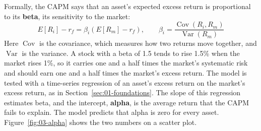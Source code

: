 Formally, the CAPM says that an asset's expected excess return is proportional to its \textbf{beta}, its sensitivity to the market:
\begin{equation}
  E[R_i] - r_f = \beta_i \left(E[R_m] - r_f\right), \qquad \beta_i = \frac{\operatorname{Cov}(R_i, R_m)}{\operatorname{Var}(R_m)}
  \label{eq:03-capm}
\end{equation}
Here $\operatorname{Cov}$ is the covariance, which measures how two returns move together, and $\operatorname{Var}$ is the variance. A stock with a beta of 1.5 tends to rise 1.5\% when the market rises 1\%, so it carries one and a half times the market's systematic risk and should earn one and a half times the market's excess return. The model is tested with a time-series regression of an asset's excess return on the market's excess return, as in Section~\ref{sec:01-foundations}. The slope of this regression estimates beta, and the intercept, \textbf{alpha}, is the average return that the CAPM fails to explain. The model predicts that alpha is zero for every asset. Figure~\ref{fig:03-alpha} shows the two numbers on a scatter plot.


